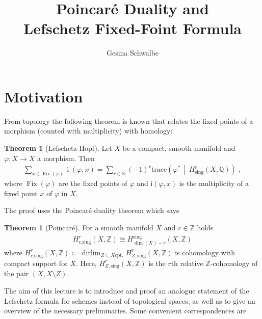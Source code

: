 \documentclass[english]{scrartcl}
\theoremstyle{definition}
\newtheorem{Thm}[Def]{Theorem}
\theoremstyle{remark}
\newcommand*{\N}{\mathds{N}}
\newcommand*{\Z}{\mathds{Z}}
\newcommand*{\Q}{\mathds{Q}}
\DeclareMathOperator*{\dirlim}{dirlim} %
\newcommand*{\trace}[2]{{\text{trace}\left(#1 \,\middle|\, #2 \right)}} %
\renewcommand*{\phi}{\varphi}
\begin{document}
\clearpairofpagestyles
{}
\cfoot*{\pagemark}

\title{Poincaré Duality and\\
  Lefschetz Fixed-Foint Formula}
\subject{Seminar:
  Deligne's proof of the Weil Conjecture%
}
\author{Gesina Schwalbe}
\maketitle
\tableofcontents

\section{Motivation}
From topology the following theorem is known that relates the fixed
points of a morphism (counted with multiplicity) with homology:
\begin{Thm}[Lefschetz-Hopf]
  Let $X$ be a compact, smooth manifold and
  $\phi\colon X\to X$ a morphism. Then
  \begin{gather*}
    \sum_{x\in\operatorname{Fix}(\phi)} \operatorname{i}(\phi,x)
    =\sum_{r\in\N}(-1)^r \trace{\phi^*}{H_\text{sing}^r(X,\Q)}\;,
  \end{gather*}
  where $\operatorname{Fix}(\phi)$ are the fixed points of $\phi$ and
  $\mathrm i(\phi,x)$ is the multiplicity of a fixed point $x$ of $\phi$
  in $X$.
\end{Thm}
The proof uses the Poincaré duality theorem which says
\begin{Thm}[Poincaré]
  For a smooth manifold $X$ and $r\in\Z$ holds
  \begin{gather*}
    H_{c\text{,sing}}^r(X,\Z) \cong H_{\dim(X)-r}^{\text{sing}}(X,\Z)
  \end{gather*}
  where $H_{c\text{,sing}}^r(X,\Z)\coloneqq
  \dirlim_{Z\subset X \text{cpt.}}H_{Z,\text{sing}}^r(X,\Z)$
  is cohomology with compact support for $X$.
  Here, $H_{Z,\text{sing}}^r(X,\Z)$ is the $r$th relative
  $\Z$-cohomology of the pair $(X,X\setminus Z)$.
\end{Thm}
The aim of this lecture is to introduce and proof an analogue
statement of the Lefschetz formula for schemes instead of topological
spaces, as well as to give an overview of the necessary preliminaries.
Some convenient correspondences are
\end{document}
